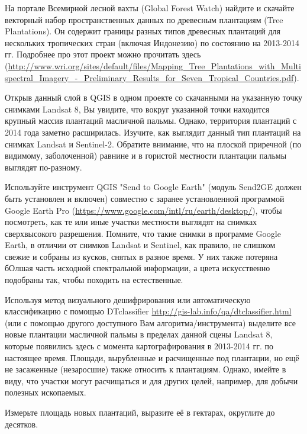 
На портале Всемирной лесной вахты (Global Forest Watch) найдите 
и скачайте векторный набор пространственных данных по древесным плантациям (Tree \linebreak Plantations). Он 
содержит границы разных типов древесных плантаций для нескольких тропических стран (включая Индонезию) 
по состоянию на 2013-2014 гг. Подробнее про этот проект можно прочитать здесь (\url{http://www.wri.org/sites/default/files/Mapping_Tree_Plantations_with_Multispectral_Imagery_-_Preliminary_}\linebreak \url{Results_for_Seven_Tropical_Countries.pdf}).

Открыв данный слой в QGIS в одном проекте со скачанными на указанную точку снимками Landsat 8, Вы увидите, что вокруг указанной точки находится крупный массив плантаций масличной пальмы. Однако, территория плантаций с 2014 года заметно расширилась. Изучите, как выглядит данный тип плантаций на снимках Landsat и Sentinel-2. Обратите внимание, что на плоской приречной (по видимому, заболоченной) равнине и в гористой местности плантации пальмы выглядят по-разному.

Используйте инструмент QGIS "Send to Google Earth" (модуль Send2GE должен быть установлен и включен) 
совместно с заранее установленной программой Google Earth Pro (\url{https://www.google.com/intl/ru/earth/desktop/}), чтобы посмотреть, как те или иные участки местности выглядят на снимках сверхвысокого разрешения. Помните, что такие снимки в программе Google Earth, в отличии от снимков Landsat и Sentinel, как правило, не слишком свежие и собраны из кусков, снятых в разное время. У них также потеряна бОлшая часть исходной спектральной информации, а цвета искусственно подобраны так, чтобы походить на естественные.

Используя метод визуального дешифрирования или автоматическую классификацию с помощью DTclassifier \url{http://gis-lab.info/qa/dtclassifier.html} (или с помощью другого доступного Вам алгоритма/инструмента) выделите все новые плантации масличной пальмы в пределах данной сцены Landsat 8, которые появились здесь с момента картографирования в 2013-2014 гг. по настоящее время. Площади, вырубленные и расчищенные под плантации, но ещё не засаженные (незаросшие) также относить к плантациям. Однако, имейте в виду, что участки могут расчищаться и для других целей, например, для добычи полезных ископаемых.

Измерьте площадь новых плантаций, выразите её в гектарах, округлите до десятков.